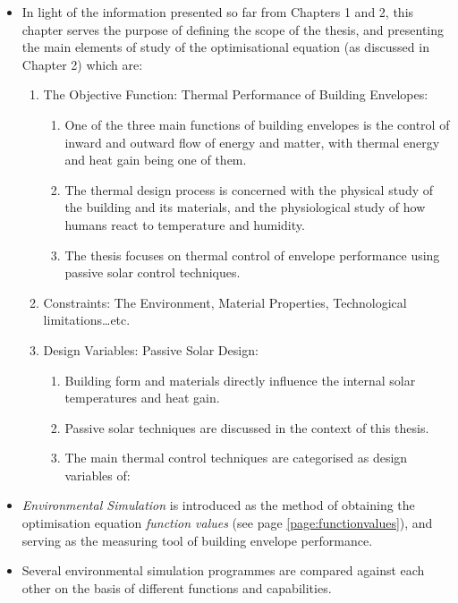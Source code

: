 \begin{itemize}
	\item In light of the information presented so far from Chapters 1 and 2, this chapter serves the purpose of defining the scope of the thesis, and presenting the main elements of study of the optimisational equation (as discussed in Chapter 2) which are:

	\begin{enumerate}
		\item The Objective Function: Thermal Performance of Building Envelopes:
			\begin{enumerate}
				\item One of the three main functions of building envelopes is the control of inward and outward flow of energy and matter, with thermal energy and heat gain being one of them.
				\item The thermal design process is concerned with the physical study of the building and its materials, and the physiological study of how humans react to temperature and humidity.
				\item The thesis focuses on thermal control of envelope performance using passive solar control techniques.
			\end{enumerate}
		\item Constraints: The Environment, Material Properties, Technological limitations\ldots{}etc.
		\item Design Variables: Passive Solar Design:
			\begin{enumerate}
				\item Building form and materials directly influence the internal solar temperatures and heat gain.
				\item Passive solar techniques are discussed in the context of this thesis.
				\item The main thermal control techniques are categorised as design variables of: 
		\end{enumerate}
\end{enumerate}

\item \emph{Environmental Simulation} is introduced as the method of obtaining the optimisation equation \emph{function values} (see page \ref{page:functionvalues}), and serving as the measuring tool of building envelope performance.
\item Several environmental simulation programmes are compared against each other on the basis of different functions and capabilities.
	\end{itemize}

